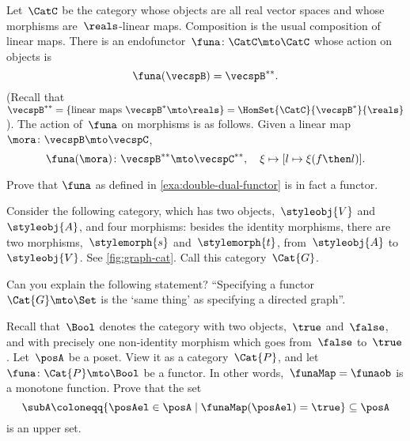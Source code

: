 \begin{example}
    \label{exa:double-dual-functor}
    Let~$\CatC$ be the category whose objects are all real vector spaces and whose morphisms are~$\reals$-linear maps.
    Composition is the usual composition of linear maps.
    There is an endofunctor~$\funa \colon \CatC \mto \CatC$ whose action on objects is
    \begin{equation}
        \funa ( \vecspB ) = \vecspB^{**}.
    \end{equation}
    (Recall that~$\vecspB^{**} = \{ \text{linear maps } \vecspB^* \mto \reals \} =  \HomSet{\CatC}{\vecspB^*}{\reals}$).
    The action of~$\funa$ on morphisms is as follows.
    Given a linear map~$\mora \colon \vecspB \mto \vecspC$,
    \begin{equation}
        \funa ( \mora ) \colon \vecspB^{**} \mto \vecspC^{**}, \quad \xi \mapsto [ l \mapsto \xi (f \then l)].
    \end{equation}
\end{example}

\begin{gradedexercise}
    \label{ex:DoubleDualFunctor}
    Prove that $\funa$ as defined in \cref{exa:double-dual-functor} is in fact a functor.
\end{gradedexercise}

\begin{gradedexercise}
    \label{ex:GraphsViaFunctors}
    Consider the following category, which has two objects,~$\styleobj{V}$ and~$\styleobj{A}$, and four morphisms:
    besides the identity morphisms, there are two morphisms,~$\stylemorph{s}$ and~$\stylemorph{t}$, from~$\styleobj{A}$ to~$\styleobj{V}$.
    See \cref{fig:graph-cat}.
    Call this category~$\Cat{G}$.
    
    Can you explain the following statement? ``Specifying a functor~$\Cat{G} \mto \Set$ is the `same thing' as specifying a directed graph''.
\end{gradedexercise}


\begin{marginfigure}
    \centering
    \caption{}
    \label{fig:graph-cat}
\end{marginfigure}

\begin{gradedexercise}
    \label{ex:UpperSetsViaFunctors}
    Recall that~$\Bool$ denotes the category with two objects,~$\true$ and~$\false$, and with precisely one non-identity morphism which goes from~$\false$ to~$\true$.
    Let~$\posA$ be a poset.
    View it as a category~$\Cat{P}$, and let~$\funa \colon \Cat{P} \mto \Bool$ be a functor.
    In other words,~$\funaMap = \funaob$ is a monotone function.
    Prove that the set
    \begin{equation}
        \subA \coloneqq \{ \posAel \in \posA \mid \funaMap(\posAel) = \true \} \subseteq \posA
    \end{equation}
    is an upper set.
\end{gradedexercise}

